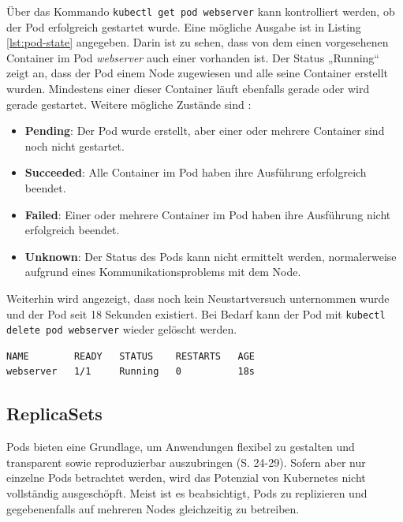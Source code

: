 \documentclass[11pt,a4paper]{article}
\begin{document}
Über das Kommando \lstinline|kubectl get pod webserver| kann kontrolliert werden,
ob der Pod erfolgreich gestartet wurde. Eine mögliche Ausgabe ist in
Listing \ref{lst:pod-state} angegeben. Darin ist zu sehen, dass
von dem einen vorgesehenen Container im Pod \emph{webserver} auch einer vorhanden ist.
Der Status „Running“ zeigt an, dass der Pod einem Node zugewiesen und alle seine Container erstellt wurden.
Mindestens einer dieser Container läuft ebenfalls gerade oder wird gerade gestartet.
Weitere mögliche Zustände sind \cite{kubernetes.io_pod_lifecycle}:
\begin{itemize}
  \item \textbf{Pending}: Der Pod wurde erstellt, aber einer oder mehrere Container sind noch nicht gestartet.
  \item \textbf{Succeeded}: Alle Container im Pod haben ihre Ausführung erfolgreich beendet.
  \item \textbf{Failed}: Einer oder mehrere Container im Pod haben ihre Ausführung nicht erfolgreich beendet.
  \item \textbf{Unknown}: Der Status des Pods kann nicht ermittelt werden, normalerweise aufgrund eines Kommunikationsproblems mit dem Node.
\end{itemize}
Weiterhin wird angezeigt, dass noch kein Neustartversuch unternommen wurde
und der Pod seit 18 Sekunden existiert.
Bei Bedarf kann der Pod mit \lstinline|kubectl delete pod webserver| wieder gelöscht werden.

\begin{lstlisting}[caption={Der Pod wurde erfolgreich gestartet \cite{Schmeling_Dargatz_2022} (S. 21).}, label={lst:pod-state}]
NAME        READY   STATUS    RESTARTS   AGE
webserver   1/1     Running   0          18s
\end{lstlisting}

\subsection{ReplicaSets}
Pods bieten eine Grundlage, um Anwendungen flexibel zu gestalten und
transparent sowie reproduzierbar auszubringen \cite{Schmeling_Dargatz_2022} (S. 24-29).
Sofern aber nur einzelne Pods betrachtet werden, wird das Potenzial von Kubernetes
nicht vollständig ausgeschöpft.
Meist ist es beabsichtigt, Pods zu replizieren und gegebenenfalls
auf mehreren Nodes gleichzeitig zu betreiben.
\end{document}
